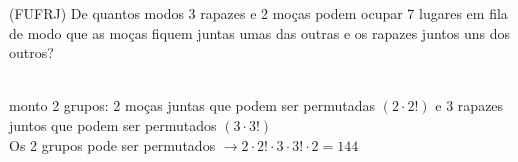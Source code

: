 \begin{ex}
(FUFRJ) De quantos modos 3 rapazes e 2 moças podem ocupar 7 lugares em fila de modo que as moças fiquem juntas umas das outras e os rapazes juntos uns dos outros?
  \begin{sol}
   \phantom{A} \\
   monto 2 grupos: 2 moças juntas que podem ser permutadas $(2\cdot2!)$ e 3 rapazes juntos que podem ser permutados $(3\cdot3!)$ \\ Os 2 grupos pode ser permutados $\rightarrow 2\cdot2!\cdot3\cdot3!\cdot2=144$
  \end{sol}
\end{ex}